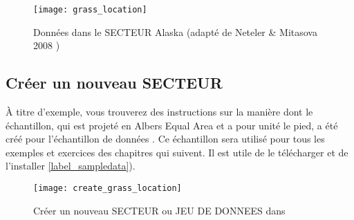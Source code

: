 \begin{figure}[ht]
\begin{center}
\texttt{[image: grass\_location]}
\caption{Données \grass dans le SECTEUR Alaska (adapté de Neteler \& Mitasova 2008 \cite{neteler_mitasova08})}\label{fig:grass_location}
\end{center}  
\end{figure}

\subsection{Créer un nouveau SECTEUR \grass}\label{sec:create_loc}

À titre d'exemple, vous trouverez des instructions sur la manière dont le  échantillon, qui est projeté en Albers Equal Area et a pour unité le pied, a été créé pour l'échantillon de données \qg. Ce  échantillon sera utilisé pour tous les exemples et exercices des chapitres \grass qui suivent. Il est utile de le télécharger et de l'installer \ref{label_sampledata}).

\begin{figure}[ht]
\begin{center}
\texttt{[image: create\_grass\_location]}
\caption{Créer un nouveau SECTEUR ou JEU DE DONNEES \grass dans \qg \nixcaption}
\label{fig:create_grass_location}
\end{center}  
\end{figure}

